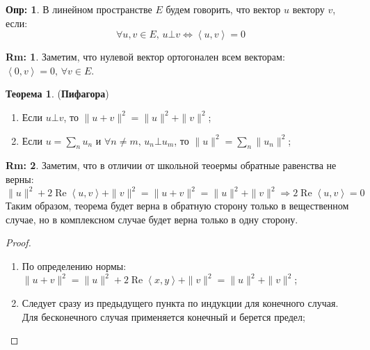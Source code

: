 \documentclass[12pt]{article}
\theoremstyle{definition}
\newtheorem{defn}{Опр:}
\newtheorem{rem}{Rm:}
\newtheorem{theorem}{Теорема}
\newcommand{\ddsum}[2]{\displaystyle\sum\limits_{#1}^{#2}}
\newcommand{\inner}[2]{\left\langle #1, #2 \right\rangle }
\begin{document}
\begin{defn}
	В линейном пространстве $E$ будем говорить, что вектор $u$  вектору $v$, если: 
	$$
		\forall u,v \in E, \, u \bot v \Leftrightarrow \inner{u}{v} = 0
	$$
\end{defn}
\begin{rem}
	Заметим, что нулевой вектор ортогонален всем векторам: $\inner{0}{v} = 0, \, \forall v \in E$.
\end{rem}
\begin{theorem}(\textbf{Пифагора})
	\begin{enumerate}[label=(\arabic*)]
		\item Если $u\bot v$, то $\|u + v\|^2 = \|u\|^2 + \|v\|^2$;
		\item Если $u = \ddsum{n}{}u_n$ и $\forall n \neq m, \, u_n \bot u_m$, то $\|u\|^2 = \ddsum{n}{}\|u_n\|^2$;
	\end{enumerate}
\end{theorem}
\begin{rem}
	Заметим, что в отличии от школьной теоермы обратные равенства не верны:
	$$
		\|u\|^2 + 2\operatorname{Re}\inner{u}{v} + \|v\|^2 = \|u + v\|^2 = \|u\|^2 + \|v\|^2 \Rightarrow 2\operatorname{Re}\inner{u}{v} = 0
	$$
	Таким образом, теорема будет верна в обратную сторону только в вещественном случае, но в комплексном случае будет верна только в одну сторону.
\end{rem}
\begin{proof}\hfill
	\begin{enumerate}[label=(\arabic*)]
		\item По определению нормы: $\|u + v\|^2  = \|u\|^2 + 2\operatorname{Re}\inner{x}{y} + \|v\|^2 = \|u\|^2 + \|v\|^2$;
		\item Следует сразу из предыдущего пункта по индукции для конечного случая. Для бесконечного случая применяется конечный и берется предел;
	\end{enumerate}
\end{proof}

\newpage
\end{document}
